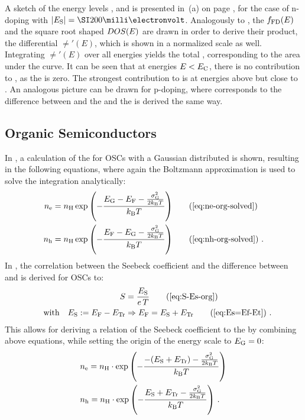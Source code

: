A sketch of the energy levels \Ef, \Ec and \Es is presented in \,(a) on page \pageref{fig:sim_Fermi-DOS-Es-inorg+org}, for the case of n-doping with $|\Es|=\meV{200}$. Analogously to , the \fFDLong $f_\text{FD}(E)$ and the square root shaped $DOS(E)$ are drawn in order to derive their product, the differential \neLong $\ne'(E)$, which is shown in a normalized scale as well. Integrating $\ne'(E)$ over all energies yields the total \neLong \ne, corresponding to the area under the curve. It can be seen that at energies $E<E_\text{C}$, there is no contribution to \ne, as the \dos is zero. The strongest contribution to \ne is at energies above but close to \Ec. An analogous picture can be drawn for p-doping, where \Es corresponds to the difference between \Ef and the \EvLong \Ev and the \nhLong \nh is derived the same way.

\subsection{Organic Semiconductors}\label{sec:TheoSeeOSC}
In , a calculation of the \nLong for OSCs with a Gaussian distributed \dosLong is shown, resulting in the following equations, where again the Boltzmann approximation is used to solve the integration analytically: %
\begin{align*}
\ne &= \nH
  \exp{-\frac{ \gausscenter - \Ef - \frac{\gausswidth^2}{2\kT}}{\kT} }
\tag{\ref{eq:ne-org-solved}}
\\
\nh &= \nH
  \exp{-\frac{ \Ef - \gausscenter - \frac{\gausswidth^2}{2\kT}}{\kT} }
\tag{\ref{eq:nh-org-solved}}
\PUNKT
\end{align*}
%
In , the correlation between the Seebeck coefficient and the difference between \EfLong \Ef and \EtLong \Et is derived for OSCs to:
\begin{align}
S &= \frac{\Es}{e\,T}
\tag{\ref{eq:S-Es-org}}
\\
\text{~~~with~~~} \Es:=\Ef-\Et &\Rightarrow \Ef=\Es+\Et
\tag{\ref{eq:Es=Ef-Et}}
\PUNKT
\end{align}
This allows for deriving a relation of the Seebeck coefficient to the \nLong by combining above equations, while setting the origin of the energy scale to \mbox{$E_\text{G}=0$}:
\begin{align}
&\ne = \nH \cdot
  \exp{-\frac{ -(\Es+\Et ) - \frac{\gausswidth^2}{2\kT}}{\kT} }
\label{eq:ne-von-Es-org}
%
\\
&\nh = \nH \cdot
  \exp{-\frac{   \Es+\Et - \frac{\gausswidth^2}{2\kT}}{\kT} }
\label{eq:nh-von-Es-org} %
\PUNKT
\end{align}


